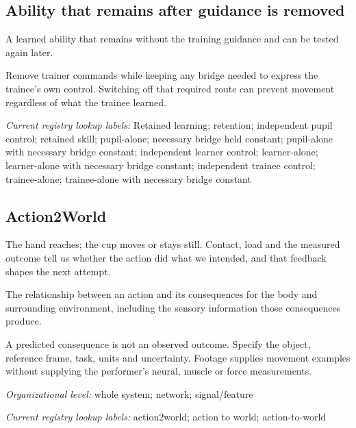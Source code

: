 \subsection*{Ability that remains after guidance is removed}
\noindent A learned ability that remains without the training guidance and can be tested again later.\par
\noindent Remove trainer commands while keeping any bridge needed to express the trainee’s own control. Switching off that required route can prevent movement regardless of what the trainee learned.\par

\noindent\textit{Current registry lookup labels:} Retained learning; retention; independent pupil control; retained skill; pupil-alone; necessary bridge held constant; pupil-alone with necessary bridge constant; independent learner control; learner-alone; learner-alone with necessary bridge constant; independent trainee control; trainee-alone; trainee-alone with necessary bridge constant\par

\begin{samepage}
\subsection*{Action2World}
\noindent The hand reaches; the cup moves or stays still. Contact, load and the measured outcome tell us whether the action did what we intended, and that feedback shapes the next attempt.\par
\end{samepage}
\noindent The relationship between an action and its consequences for the body and surrounding environment, including the sensory information those consequences produce.\par
\noindent A predicted consequence is not an observed outcome. Specify the object, reference frame, task, units and uncertainty. Footage supplies movement examples without supplying the performer's neural, muscle or force measurements.\par
\begin{samepage}
\noindent\textit{Organizational level:} whole system; network; signal/feature\par\nopagebreak[4]

\end{samepage}


\noindent\textit{Current registry lookup labels:} action2world; action to world; action-to-world\par

